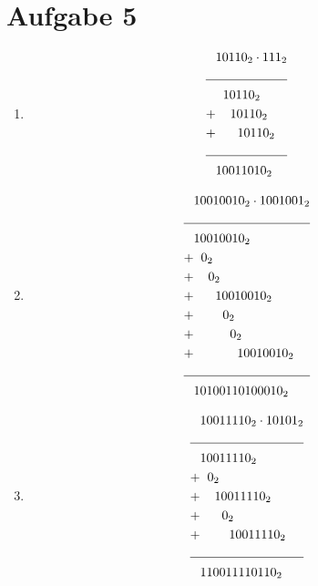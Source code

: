 \documentclass{scrreprt}
\begin{document}
    \section{Aufgabe 5}
    \begin{enumerate}[label = (\alph*)]
        \item 
            \begin{align*}
                &{10110}_2 \cdot {111}_2 \\
                \cline{1-2}
                &\hspace{0.2cm}{10110}_2 \\ 
                + &\hspace{0.4cm}  {10110}_2 \\
                + &\hspace{0.6cm} {10110}_2\\
                \cline{1-2}
                &{10011010}_2
            \end{align*}
        \item
            \begin{align*}
                &{10010010}_2 \cdot {1001001}_2 \\
                \cline{1-2}
                &{10010010}_2 \\
                + &\hspace{0.2cm} {0}_2 \\
                + &\hspace{0.4cm} {0}_2 \\
                + &\hspace{0.6cm} {10010010}_2 \\
                + &\hspace{0.8cm} {0}_2 \\
                + &\hspace{1.0cm} {0}_2 \\
                + &\hspace{1.2cm} {10010010}_2 \\
                \cline{1-2}
                &{10100110100010}_2
            \end{align*}
        \item
            \begin{align*}
                &{10011110}_2 \cdot {10101}_2 \\
                \cline{1-2}
                &{10011110}_2 \\
                +&\hspace{0.2cm}0_2 \\
                +&\hspace{0.4cm}{10011110}_2  \\
                +&\hspace{0.6cm}0_2 \\
                +&\hspace{0.8cm}{10011110}_2  \\
                \cline{1-2}
                &{110011110110}_2
            \end{align*}
    \end{enumerate}
\end{document}
